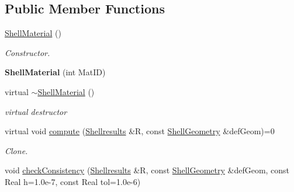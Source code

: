 \subsection*{Public Member Functions}
\begin{DoxyCompactItemize}
\item 
\hypertarget{classvoom_1_1_shell_material_afb7110f588d453d03cd464314f37f84b}{
\hyperlink{classvoom_1_1_shell_material_afb7110f588d453d03cd464314f37f84b}{ShellMaterial} ()}
\label{classvoom_1_1_shell_material_afb7110f588d453d03cd464314f37f84b}

\begin{DoxyCompactList}\small\item\em Constructor. \item\end{DoxyCompactList}\item 
\hypertarget{classvoom_1_1_shell_material_a45d530e8971a173fcecc319c8def3d6a}{
{\bfseries ShellMaterial} (int MatID)}
\label{classvoom_1_1_shell_material_a45d530e8971a173fcecc319c8def3d6a}

\item 
\hypertarget{classvoom_1_1_shell_material_a0883f607968a5f6a4661771dcf78a1c3}{
virtual \hyperlink{classvoom_1_1_shell_material_a0883f607968a5f6a4661771dcf78a1c3}{$\sim$ShellMaterial} ()}
\label{classvoom_1_1_shell_material_a0883f607968a5f6a4661771dcf78a1c3}

\begin{DoxyCompactList}\small\item\em virtual destructor \item\end{DoxyCompactList}\item 
virtual void \hyperlink{classvoom_1_1_shell_material_a959c8ad040d53a39218a7dbe6258472d}{compute} (\hyperlink{structvoom_1_1_shell_material_1_1_shellresults}{Shellresults} \&R, const \hyperlink{classvoom_1_1_shell_geometry}{ShellGeometry} \&defGeom)=0
\begin{DoxyCompactList}\small\item\em Clone. \item\end{DoxyCompactList}\item 
\hypertarget{classvoom_1_1_shell_material_ad7f4ea96a247f00522a267b0be92f059}{
void \hyperlink{classvoom_1_1_shell_material_ad7f4ea96a247f00522a267b0be92f059}{checkConsistency} (\hyperlink{structvoom_1_1_shell_material_1_1_shellresults}{Shellresults} \&R, const \hyperlink{classvoom_1_1_shell_geometry}{ShellGeometry} \&defGeom, const Real h=1.0e-\/7, const Real tol=1.0e-\/6)}
\label{classvoom_1_1_shell_material_ad7f4ea96a247f00522a267b0be92f059}


\end{DoxyCompactItemize}
